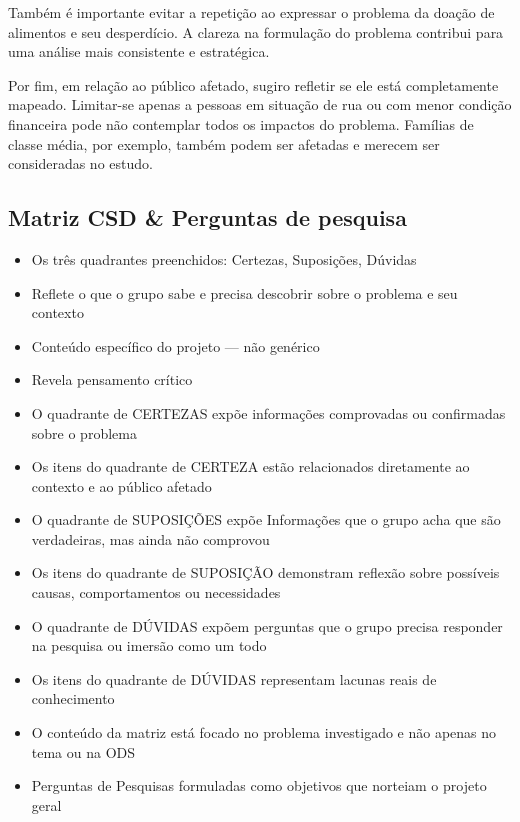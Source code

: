 \documentclass[
  sigconf,
  nonacm, %
  language=portuguese
]{acmart}
\newcommand{\statuswarn}[1]{{\small\bfseries\color{cwarn}#1}}
\begin{document}
Também é importante evitar a repetição ao expressar o problema da doação de alimentos e seu desperdício. A clareza na formulação do problema contribui para uma análise mais consistente e estratégica.

Por fim, em relação ao público afetado, sugiro refletir se ele está completamente mapeado. Limitar-se apenas a pessoas em situação de rua ou com menor condição financeira pode não contemplar todos os impactos do problema. Famílias de classe média, por exemplo, também podem ser afetadas e merecem ser consideradas no estudo.

\subsection{Matriz CSD \& Perguntas de pesquisa}

\noindent\statuswarn{0,42\,/\,0,50 pts · Completo c/ ressalvas}

\begin{itemize}[leftmargin=14pt,itemsep=1pt,topsep=3pt,parsep=0pt]
  \item[\textcolor{cgood}{$\checkmark$}] {\small\textcolor{cgood}{Os três quadrantes preenchidos: Certezas, Suposições, Dúvidas}}
  \item[\textcolor{cgood}{$\checkmark$}] {\small\textcolor{cgood}{Reflete o que o grupo sabe e precisa descobrir sobre o problema e seu contexto}}
  \item[\textcolor{cgood}{$\checkmark$}] {\small\textcolor{cgood}{Conteúdo específico do projeto — não genérico}}
  \item[\textcolor{cgood}{$\checkmark$}] {\small\textcolor{cgood}{Revela pensamento crítico}}
  \item[\textcolor{cgood}{$\checkmark$}] {\small\textcolor{cgood}{O quadrante de CERTEZAS expõe informações comprovadas ou confirmadas sobre o problema}}
  \item[\textcolor{cgood}{$\checkmark$}] {\small\textcolor{cgood}{Os itens do quadrante de CERTEZA estão relacionados diretamente ao contexto e ao público afetado}}
  \item[\textcolor{cgood}{$\checkmark$}] {\small\textcolor{cgood}{O quadrante de SUPOSIÇÕES expõe Informações que o grupo acha que são verdadeiras, mas ainda não comprovou}}
  \item[\textcolor{cgood}{$\checkmark$}] {\small\textcolor{cgood}{Os itens do quadrante de SUPOSIÇÃO demonstram reflexão sobre possíveis causas, comportamentos ou necessidades}}
  \item[\textcolor{cgood}{$\checkmark$}] {\small\textcolor{cgood}{O quadrante de DÚVIDAS expõem perguntas que o grupo precisa responder na pesquisa ou imersão como um todo}}
  \item[\textcolor{cgood}{$\checkmark$}] {\small\textcolor{cgood}{Os itens do quadrante de DÚVIDAS representam lacunas reais de conhecimento}}
  \item[$\square$] {\small\textcolor{cmuted}{O conteúdo da matriz está focado no problema investigado e não apenas no tema ou na ODS}}
  \item[$\square$] {\small\textcolor{cmuted}{Perguntas de Pesquisas formuladas como objetivos que norteiam o projeto geral}}
\end{itemize}
\end{document}
